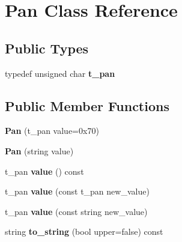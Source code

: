 \hypertarget{class_pan}{}\section{Pan Class Reference}
\label{class_pan}
\subsection*{Public Types}
\begin{DoxyCompactItemize}
\item 
typedef unsigned char {\bfseries t\+\_\+pan}\hypertarget{class_pan_aec51654a090f7770388b877abb55b535}{}\label{class_pan_aec51654a090f7770388b877abb55b535}

\end{DoxyCompactItemize}
\subsection*{Public Member Functions}
\begin{DoxyCompactItemize}
\item 
{\bfseries Pan} (t\+\_\+pan value=0x70)\hypertarget{class_pan_a06fc7230ec25023e362fe3f168097a80}{}\label{class_pan_a06fc7230ec25023e362fe3f168097a80}

\item 
{\bfseries Pan} (string value)\hypertarget{class_pan_a7e11dc90a5526dcc69785787733a6a0f}{}\label{class_pan_a7e11dc90a5526dcc69785787733a6a0f}

\item 
t\+\_\+pan {\bfseries value} () const \hypertarget{class_pan_ae0fa8cd372ee982f785341b41310c360}{}\label{class_pan_ae0fa8cd372ee982f785341b41310c360}

\item 
t\+\_\+pan {\bfseries value} (const t\+\_\+pan new\+\_\+value)\hypertarget{class_pan_a4accd9e706ae4c2131d83910ef62ab42}{}\label{class_pan_a4accd9e706ae4c2131d83910ef62ab42}

\item 
t\+\_\+pan {\bfseries value} (const string new\+\_\+value)\hypertarget{class_pan_a37962558bc697712f4c26d5d962cb2fa}{}\label{class_pan_a37962558bc697712f4c26d5d962cb2fa}

\item 
string {\bfseries to\+\_\+string} (bool upper=false) const \hypertarget{class_pan_a507912bae91873b925beaa052be51459}{}\label{class_pan_a507912bae91873b925beaa052be51459}

\end{DoxyCompactItemize}
